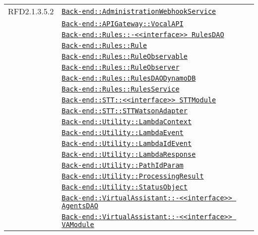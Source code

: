 \begin{longtable}{|>{\centering}m{3cm}|m{10cm}<{\centering}|}
RFD2.1.3.5.2 & \hyperref[Back-end::AdministrationWebhookService]{\texttt{Back-end::AdministrationWebhookService}}\\
& \hyperref[Back-end::APIGateway::VocalAPI]{\texttt{Back-end::APIGateway::VocalAPI}}\\
& \hyperref[Back-end::Rules::<<interface>> RulesDAO]{\texttt{Back-end::Rules::-\linebreak <<interface>> RulesDAO}}\\
& \hyperref[Back-end::Rules::Rule]{\texttt{Back-end::Rules::Rule}}\\
& \hyperref[Back-end::Rules::RuleObservable]{\texttt{Back-end::Rules::RuleObservable}}\\
& \hyperref[Back-end::Rules::RuleObserver]{\texttt{Back-end::Rules::RuleObserver}}\\
& \hyperref[Back-end::Rules::RulesDAODynamoDB]{\texttt{Back-end::Rules::RulesDAODynamoDB}}\\
& \hyperref[Back-end::Rules::RulesService]{\texttt{Back-end::Rules::RulesService}}\\
& \hyperref[Back-end::STT::<<interface>> STTModule]{\texttt{Back-end::STT::<<interface>> STTModule}}\\
& \hyperref[Back-end::STT::STTWatsonAdapter]{\texttt{Back-end::STT::STTWatsonAdapter}}\\
& \hyperref[Back-end::Utility::LambdaContext]{\texttt{Back-end::Utility::LambdaContext}}\\
& \hyperref[Back-end::Utility::LambdaEvent]{\texttt{Back-end::Utility::LambdaEvent}}\\
& \hyperref[Back-end::Utility::LambdaIdEvent]{\texttt{Back-end::Utility::LambdaIdEvent}}\\
& \hyperref[Back-end::Utility::LambdaResponse]{\texttt{Back-end::Utility::LambdaResponse}}\\
& \hyperref[Back-end::Utility::PathIdParam]{\texttt{Back-end::Utility::PathIdParam}}\\
& \hyperref[Back-end::Utility::ProcessingResult]{\texttt{Back-end::Utility::ProcessingResult}}\\
& \hyperref[Back-end::Utility::StatusObject]{\texttt{Back-end::Utility::StatusObject}}\\
& \hyperref[Back-end::VirtualAssistant::<<interface>> AgentsDAO]{\texttt{Back-end::VirtualAssistant::-\linebreak <<interface>> AgentsDAO}}\\
& \hyperref[Back-end::VirtualAssistant::<<interface>> VAModule]{\texttt{Back-end::VirtualAssistant::-\linebreak <<interface>> VAModule}}\\

\end{longtable}
